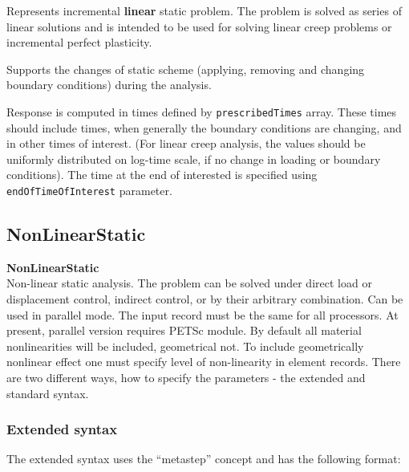 \documentclass[a4paper]{article}
\newcommand{\param}[1]{\texttt{#1}} %
\newcommand{\entKeywordInst}[1]{\textbf{#1}} %
\newcommand{\Pmode}[1]{{\sffamily #1}}
\begin{document}
Represents incremental \textbf{linear} static problem.
The problem is solved as series of linear solutions and is intended to
be used for solving linear creep problems or incremental perfect plasticity.

Supports the changes of static scheme (applying, removing and changing  boundary conditions)
during the analysis.

Response is computed in times defined by \param{pre\-scri\-bed\-Ti\-mes}
array. These times should include times, when generally the  boundary
conditions are changing, and in other times of interest. (For linear creep
analysis, the values should be uniformly distributed on log-time scale, if no change in
loading or boundary conditions). The time at the end of interested is
specified using \param{endOfTimeOfInterest} parameter.

\subsection{NonLinearStatic}
\label{NonLinearStatic}
\entKeywordInst{NonLinearStatic} \\
Non-linear static analysis. The problem can be solved under
direct load or displacement control, indirect control, or by
their arbitrary combination.
\Pmode{Can be used in parallel mode. The input record must be the same
for all processors. At present, parallel version requires PETSc module.}
By default all
material nonlinearities will be included, geometrical not.
To include geometrically nonlinear effect one must specify
level of non-linearity in element records.
There are two different ways, how to specify the parameters - the
extended and standard syntax.
\subsubsection{Extended syntax}
The extended syntax uses the ``metastep'' concept and has the
following format:
\end{document}
